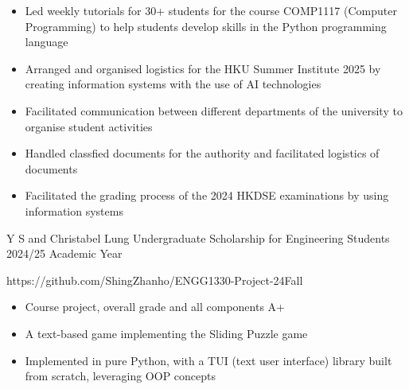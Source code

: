 \documentclass[10pt,a4paper,withhypeper,normalphoto]{altacv}
\begin{document}
\begin{paracol}{2}


\begin{itemize}
  \item Led weekly tutorials for 30+ students for the course COMP1117 (Computer Programming) to help students develop skills in the Python programming language
\end{itemize}

\divider

\begin{itemize}
\item Arranged and organised logistics for the HKU Summer Institute 2025 by creating information systems with the use of AI technologies
\item Facilitated communication between different departments of the university to organise student activities
\end{itemize}

\divider


\begin{itemize}
\item Handled classfied documents for the authority and facilitated logistics of documents
\item Facilitated the grading process of the 2024 HKDSE examinations by using information systems
\end{itemize}


\cvachievement
  {\faTrophy}
  {Y S and Christabel Lung Undergraduate Scholarship for Engineering Students}
  {2024/25 Academic Year}



{
https://github.com/ShingZhanho/ENGG1330-Project-24Fall
\begin{itemize}
  \item Course project, overall grade and all components A+
  \item A text-based game implementing the Sliding Puzzle game
  \item Implemented in pure Python, with a TUI (text user interface) library built from scratch,
        leveraging OOP concepts
\end{itemize}
}


\end{paracol}
\end{document}

